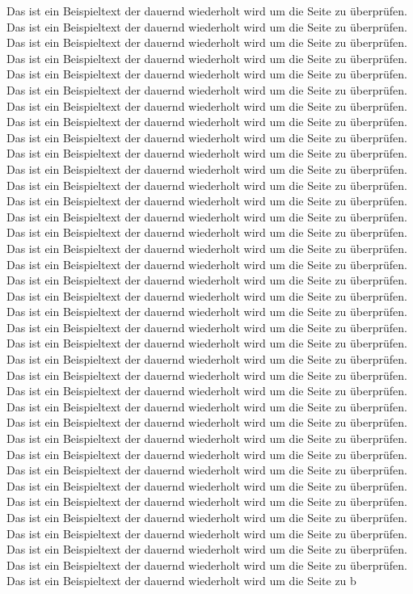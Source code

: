 Das ist ein Beispieltext der dauernd wiederholt wird um die Seite zu überprüfen. Das ist ein Beispieltext der dauernd wiederholt wird um die Seite zu überprüfen. Das ist ein Beispieltext der dauernd wiederholt wird um die Seite zu überprüfen. Das ist ein Beispieltext der dauernd wiederholt wird um die Seite zu überprüfen. Das ist ein Beispieltext der dauernd wiederholt wird um die Seite zu überprüfen. Das ist ein Beispieltext der dauernd wiederholt wird um die Seite zu überprüfen. Das ist ein Beispieltext der dauernd wiederholt wird um die Seite zu überprüfen. Das ist ein Beispieltext der dauernd wiederholt wird um die Seite zu überprüfen. Das ist ein Beispieltext der dauernd wiederholt wird um die Seite zu überprüfen. Das ist ein Beispieltext der dauernd wiederholt wird um die Seite zu überprüfen. Das ist ein Beispieltext der dauernd wiederholt wird um die Seite zu überprüfen. Das ist ein Beispieltext der dauernd wiederholt wird um die Seite zu überprüfen. Das ist ein Beispieltext der dauernd wiederholt wird um die Seite zu überprüfen. Das ist ein Beispieltext der dauernd wiederholt wird um die Seite zu überprüfen. Das ist ein Beispieltext der dauernd wiederholt wird um die Seite zu überprüfen. Das ist ein Beispieltext der dauernd wiederholt wird um die Seite zu überprüfen. Das ist ein Beispieltext der dauernd wiederholt wird um die Seite zu überprüfen. Das ist ein Beispieltext der dauernd wiederholt wird um die Seite zu überprüfen. Das ist ein Beispieltext der dauernd wiederholt wird um die Seite zu überprüfen. Das ist ein Beispieltext der dauernd wiederholt wird um die Seite zu überprüfen. Das ist ein Beispieltext der dauernd wiederholt wird um die Seite zu überprüfen. Das ist ein Beispieltext der dauernd wiederholt wird um die Seite zu überprüfen. Das ist ein Beispieltext der dauernd wiederholt wird um die Seite zu überprüfen. Das ist ein Beispieltext der dauernd wiederholt wird um die Seite zu überprüfen. Das ist ein Beispieltext der dauernd wiederholt wird um die Seite zu überprüfen. Das ist ein Beispieltext der dauernd wiederholt wird um die Seite zu überprüfen. Das ist ein Beispieltext der dauernd wiederholt wird um die Seite zu überprüfen. Das ist ein Beispieltext der dauernd wiederholt wird um die Seite zu überprüfen. Das ist ein Beispieltext der dauernd wiederholt wird um die Seite zu überprüfen. Das ist ein Beispieltext der dauernd wiederholt wird um die Seite zu überprüfen. Das ist ein Beispieltext der dauernd wiederholt wird um die Seite zu überprüfen. Das ist ein Beispieltext der dauernd wiederholt wird um die Seite zu überprüfen. Das ist ein Beispieltext der dauernd wiederholt wird um die Seite zu überprüfen. Das ist ein Beispieltext der dauernd wiederholt wird um die Seite zu überprüfen. Das ist ein Beispieltext der dauernd wiederholt wird um die Seite zu überprüfen. Das ist ein Beispieltext der dauernd wiederholt wird um die Seite zu überprüfen. Das ist ein Beispieltext der dauernd wiederholt wird um die Seite zu b